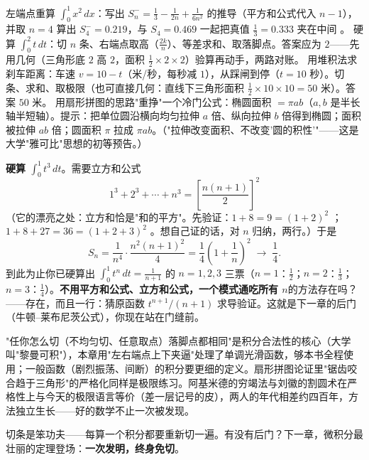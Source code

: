 \begin{dongshou}
\begin{itemize}
  \yisi 左端点重算 $\displaystyle\int_0^1 x^2\,dx$：写出 $S_n^- = \tfrac13 - \tfrac{1}{2n} + \tfrac{1}{6n^2}$ 的推导（平方和公式代入 $n-1$），并取 $n = 4$ 算出 $S_4^- = 0.219$，与 $S_4 = 0.469$ 一起把真值 $\tfrac13 = 0.333$ 夹在中间 \checkmark。
  \yier 硬算 $\displaystyle\int_0^2 t\,dt$：切 $n$ 条、右端点取高（$\tfrac{2k}n$）、等差求和、取落脚点。答案应为 $2$——先用几何（三角形底 $2$ 高 $2$，面积 $\tfrac12\times2\times2$）验算再动手，两路对账。
  \yier 用堆积法求刹车距离：车速 $v = 10 - t$（米/秒，每秒减 $1$），从踩闸到停（$t = 10$ 秒）。切条、求和、取极限（也可直接几何：直线下三角形面积 $\tfrac12\times10\times10 = 50$ 米）。答案 $50$ 米。
  \yier 用扇形拼图的思路"重挣"一个冷门公式：椭圆面积 $= \pi ab$（$a, b$ 是半长轴半短轴）。提示：把单位圆沿横向均匀拉伸 $a$ 倍、纵向拉伸 $b$ 倍得到椭圆；面积被拉伸 $ab$ 倍；圆面积 $\pi$ 拉成 $\pi ab$。（"拉伸改变面积、不改变'圆的积性'"——这是大学"雅可比"思想的初等预告。）
\end{itemize}
\end{dongshou}

\begin{shaonao}
\textbf{硬算 $\displaystyle\int_0^1 t^3\,dt$}。需要立方和公式
\[
1^3 + 2^3 + \cdots + n^3 = \left[\frac{n(n+1)}{2}\right]^2
\]
（它的漂亮之处：立方和恰是"和的平方"。先验证：$1 + 8 = 9 = (1+2)^2$ \checkmark；$1+8+27 = 36 = (1+2+3)^2$ \checkmark。想自己证的话，对 $n$ 归纳，两行。）于是
\[
S_n = \frac{1}{n^4}\cdot\frac{n^2(n+1)^2}{4} = \frac14\left(1 + \frac1n\right)^2 \;\longrightarrow\; \frac14 .
\]
到此为止你已硬算出 $\int_0^1 t^n\,dt = \tfrac1{n+1}$ 的 $n = 1, 2, 3$ 三票（$n=1$：$\tfrac12$；$n=2$：$\tfrac13$；$n=3$：$\tfrac14$）。\textbf{不用平方和公式、立方和公式，一个模式通吃所有 $n$}的方法存在吗？——存在，而且一行：猜原函数 $t^{n+1}/(n+1)$ 求导验证。这就是下一章的后门（牛顿--莱布尼茨公式），你现在站在门缝前。
\end{shaonao}

\begin{chengshi}
"任你怎么切（不均匀切、任意取点）落脚点都相同"是积分合法性的核心（大学叫"黎曼可积"），本章用"左右端点上下夹逼"处理了单调光滑函数，够本书全程使用；一般函数（剧烈振荡、间断）的积分要更细的定义。扇形拼图论证里"锯齿咬合趋于三角形"的严格化同样是极限练习。阿基米德的穷竭法与刘徽的割圆术在严格性上与今天的极限语言等价（差一层记号的皮），两人的年代相差约四百年，方法独立生长——好的数学不止一次被发现。
\end{chengshi}

切条是笨功夫——每算一个积分都要重新切一遍。有没有后门？下一章，微积分最壮丽的定理登场：\textbf{一次发明，终身免切}。
